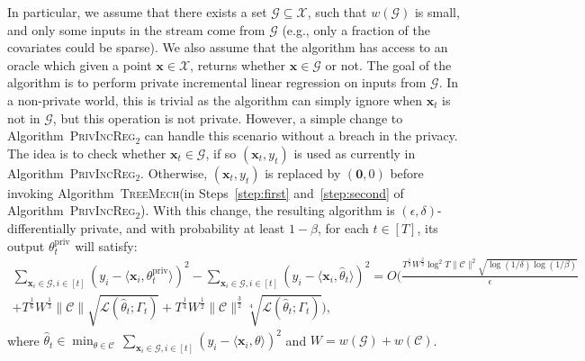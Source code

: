 \documentclass{article}
\theoremstyle{plain}
\def \TreeMech {\textsc{TreeMech}\xspace}
\def \ProjPrivIncReg {\textsc{PrivIncReg$_2$}\xspace}
\def \eps {\epsilon}
\def \CCC {\mathcal{C}}
\def \GGG {\mathcal{G}}
\def \XXX {\mathcal{X}}
\def \LLL {\mathcal{L}}
\def \priv {{\mathrm{priv}}}
\def \x {\mathbf x}
\begin{document}
In particular, we assume that there exists a set $\GGG \subseteq \XXX$, such that $w(\GGG)$ is small, and only some inputs in the stream come from $\GGG$ (e.g., only a fraction of the covariates could be sparse). We also assume that the algorithm has access to an oracle which given a point $\x \in \XXX$, returns whether $\x \in \GGG$ or not. The goal of the algorithm is to perform private incremental linear regression on inputs from $\GGG$. In a non-private world, this is trivial as the algorithm can simply ignore when $\x_t$ is not in $\GGG$, but this operation is not private. However, a simple change to Algorithm~\ProjPrivIncReg can handle this scenario without a breach in the privacy. The idea is to check whether $\x_t \in \GGG$, if so $(\x_t,y_t)$ is used as currently in Algorithm~\ProjPrivIncReg. Otherwise, $(\x_t,y_t)$ is replaced by $(\mathbf{0},0)$ before invoking Algorithm~\TreeMech (in Steps~\ref{step:first} and~\ref{step:second} of Algorithm~\ProjPrivIncReg). With this change, the resulting algorithm is $(\eps,\delta)$-differentially private, and with probability at least $1-\beta$, for each $t \in [T]$, its output $\theta^\priv_t$ will satisfy:
\begin{multline*}
\sum_{\x_i \in \GGG, i \in [t]}(y_i - \langle \x_i, \theta^\priv_t \rangle)^2 -  \sum_{\x_i \in \GGG, i \in [t]}(y_i - \langle \x_i, \hat{\theta}_t \rangle)^2 
 = O(\frac{T^{\frac 1 3} W^{\frac 2 3} \log^{2} T \| \CCC \|^2  \sqrt{\log(1/\delta) \log(1/\beta)}}{\eps} \\ 
+ T^{\frac 1 6}W^{\frac 1 3} \| \CCC \|\sqrt{\LLL(\hat{\theta}_t;\Gamma_t)} + T^{\frac 1 4}W^{\frac 1 2} \| \CCC \|^{\frac 3 2} \sqrt[4]{\LLL(\hat{\theta}_t;\Gamma_t)}),
\end{multline*}
where $\hat{\theta}_t \in \min_{\theta \in \CCC}\, \sum_{\x_i \in \GGG, i \in [t]}(y_i - \langle \x_i, \theta \rangle)^2$ and $W=w(\GGG)+w(\CCC)$.
\end{document}
